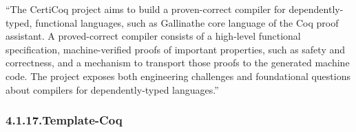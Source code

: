\documentclass[12pt,twoside]{article}
\begin{document}
\noindent{}\textquotedblleft{}The CertiCoq project aims to build a proven-correct compiler for
dependently-typed, functional languages, such as Gallinathe core
language of the Coq proof assistant. A proved-correct compiler
consists of a high-level functional specification, machine-verified
proofs of important properties, such as safety and correctness, and a
mechanism to transport those proofs to the generated machine code. The
project exposes both engineering challenges and foundational questions
about compilers for dependently-typed languages.\textquotedblright{}%

\subsubsection{4.1.17.\hspace*{0.5em}Template-Coq}%
\end{document}
